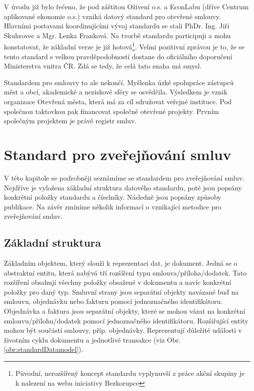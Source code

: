 V úvodu již bylo řečeno, že pod záštitou Oživení o.s.\cite{oz} a EconLabu\cite{econLab} (dříve Centrum aplikované ekonomie o.s.) vzniká datový standard pro otevřené smlouvy. Hlavními postavami koordinujícími vývoj standardu se stali PhDr. Ing. Jiří Skuhrovec a Mgr. Lenka Franková. Na tvorbě standardu participuji a mohu konstatovat, že základní verze je již hotová\footnote{Původní, nerozšířený koncept standardu vyplynuvší z práce akční skupiny je k nalezení na webu iniciativy Bezkorupce\cite{standard}}. Velmi pozitivní zprávou je to, že se tento standard s velkou pravděpodobností dostane do oficiálního doporučení Ministerstva vnitra ČR. Zdá se tedy, že celá tato snaha má smysl.

Standardem pro smlouvy to ale nekončí. Myšlenka úzké spolupráce zástupců měst a obcí, akademické a neziskové sféry se osvědčila. Výsledkem je vznik organizace Otevřená města\cite{otv}, která má za cíl sdružovat veřejné instituce. Pod společnou taktovkou pak financovat společné otevřené projekty. Prvním společným projektem je právě registr smluv. \cite{opendatapsi, opendatagovernment, opendatacr, odgov_s}

\section[Standard pro zveřejňování smluv]{Standard pro zveřejňování smluv\cite{metodika, standard}}

V této kapitole se podrobněji seznámíme se standardem pro zveřejňování smluv. Nejdříve je vyložena základní struktura datového standardu, poté jsou popsány konkrétní položky standardu a číselníky. Následně jsou popsány způsoby publikace. Na závěr zmíníme několik informací o vznikající metodice pro zveřejňování smluv. 

\subsection{Základní struktura}

Základním objektem, který slouží k reprezentaci dat, je dokument. Jedná se o abstraktní entitu, která nabývá tří rozšíření typu smlouva/příloha/dodatek. Tato rozšíření obsahují všechny položky obsažené v dokumentu a navíc konkrétní položky pro daný typ.
Smluvní strany jsou separátní objekty navázané buď na smlouvu, objednávku nebo fakturu pomocí jednoznačného identifikátoru.
Objednávka a faktura jsou separátní objekty, které se mohou vázat na konkrétní smlouvu/přílohu/dodatek pomocí jednoznačného identifikátoru.
Rozšiřující entity mohou být součástí smlouvy, příp. objednávky. Reprezentují důležité události v životním cyklu dokumentu a jednotlivé transakce (viz Obr. \ref{obr:standardDatamodel}). 

